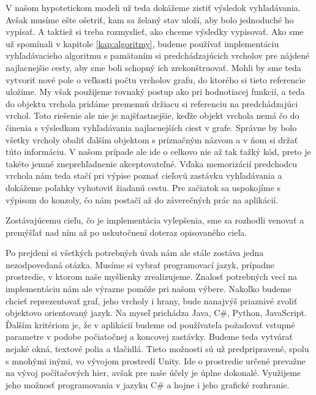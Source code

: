 V našom hypotetickom modeli už teda dokážeme zistiť výsledok vyhľadávania. Avšak musíme ešte ošetriť, kam sa želaný stav uloží, aby bolo jednoduché ho vypísať. A taktiež si treba rozmyslieť, ako chceme výsledky vypisovať. Ako sme už spomínali v kapitole \ref{kap:algoritmy}, budeme používať implementáciu vyhľadávacieho algoritmu s pamätaním si predchádzajúcich vrcholov pre nájdené najlacnejšie cesty, aby sme boli schopný ich zrekonštruovať. Mohli by sme teda vytvoriť nové pole o veľkosti počtu vrcholov grafu, do ktorého si tieto referencie uložíme. My však použijeme rovnaký postup ako pri hodnotiacej funkcií, a teda do objektu vrchola pridáme premennú držiacu si referenciu na predchádzajúci vrchol. Toto riešenie ale nie je najšťastnejšie, keďže objekt vrchola nemá čo do činenia s výsledkom vyhľadávania najlacnejších ciest v grafe. Správne by bolo všetky vrcholy obaliť ďalším objektom s príznačným názvom a v ňom si držať túto informáciu. V našom prípade ale ide o celkovo nie až tak ťažký kód, preto je takéto jemné zneprehľadnenie akceptovateľné. Vďaka memorizácií predchodcu vrchola nám teda stačí pri výpise poznať cieľovú zastávku vyhľadávania a dokážeme poľahky vyhotoviť žiadanú cestu. Pre začiatok sa uspokojíme s výpisom do konzoly, čo nám postačí až do záverečných prác na aplikácií.\newline

Zostávajúcemu cieľu, čo je implementácia vylepšenia, sme sa rozhodli venovať a premýšľať nad ním až po uskutočnení doteraz opisovaného cieľa.\newline

Po prejdení si všetkých potrebných úvah nám ale stále zostáva jedna nezodpovedaná otázka. Musíme si vybrať programovací jazyk, prípadne prostredie, v ktorom naše myšlienky zrealizujeme. Znalosť potrebných vecí na implementáciu nám ale výrazne pomôže pri našom výbere. Nakoľko budeme chcieť reprezentovať graf, jeho vrcholy i hrany, bude nanajvýš priaznivé zvoliť objektovo orientovaný jazyk. Na myseľ prichádza Java, C\#, Python, JavaScript. Ďalším kritériom je, že v aplikácií budeme od používateľa požadovať vstupné parametre v podobe počiatočnej a koncovej zastávky. Budeme teda vytvárať nejaké okná, textové polia a tlačidlá. Tieto možnosti sú už predpripravené, spolu s mnohými inými, vo vývojom prostredí Unity. Ide o prostredie určené prevažne na vývoj počítačových hier, avšak pre naše účely je úplne dokonalé. Využijeme jeho možnosť programovania v jazyku C\# a hojne i jeho grafické rozhranie.\newline


